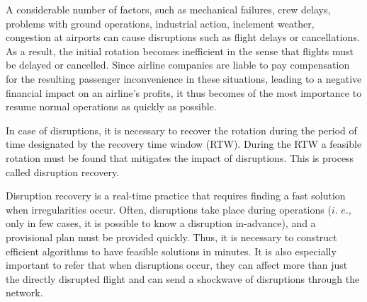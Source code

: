 \documentclass[ijoo,nonblindrev]{informs-ijoo}
\begin{document}
A considerable number of factors, such as mechanical failures, crew delays, problems with ground operations, industrial action, inclement weather, congestion at airports can cause disruptions such as flight delays or cancellations. As a result, the initial rotation becomes inefficient in the sense that flights must be delayed or cancelled. Since airline companies are liable to pay compensation for the resulting passenger inconvenience in these situations, leading to a negative financial impact on an airline’s profits, it thus becomes of the most importance to resume normal operations as quickly as possible. 



In case of disruptions, it is necessary to recover the rotation during the period of time designated by the recovery time window (RTW). During the RTW a feasible rotation must be found that mitigates the impact of disruptions. This is process called disruption recovery.

Disruption recovery is a real-time practice that requires finding a fast solution when irregularities occur. Often, disruptions take place during operations ($i.$ $e.$, only in few cases, it is possible to know a disruption in-advance), and a provisional plan must be provided quickly. Thus, it is necessary to construct efficient algorithms to have feasible solutions in minutes. It is also especially important to refer that when disruptions occur, they can affect more than just the directly disrupted flight and can send a shockwave of disruptions through the network.
\end{document}
